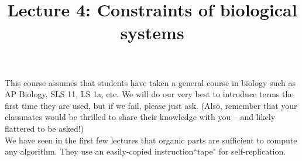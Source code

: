 \documentclass{article}
\begin{document}
\large

\title{Lecture 4: Constraints of biological systems}
\maketitle

This course assumes that students have taken a general course in biology such as AP Biology, SLS 11, LS 1a, etc. We will do our very best to introduce terms the first time they are used, but if we fail, please just ask. (Also, remember that your classmates would be thrilled to share their knowledge with you -- and likely flattered to be asked!)\\

We have seen in the first few lectures that organic parts are sufficient to compute any algorithm. They use an easily-copied instruction``tape" for self-replication.
\end{document}
